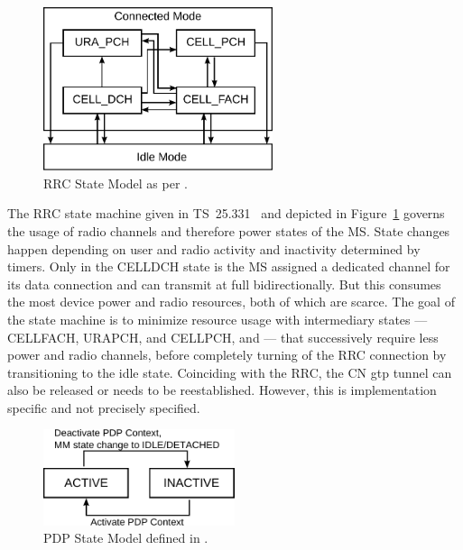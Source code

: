 \begin{figure}[htb] 
	\centering
	\includegraphics[width=0.6\textwidth]{images/rrc-state-model.pdf}
	\caption{\acrshort{RRC} State Model as per \cite[Section~7.1]{3gpp.25.331}.}
	\label{c4:fig:rrcstatemodel}
\end{figure}

 The \gls{RRC} state machine given in \gls{TS}~25.331~\cite[Section~7.1]{3gpp.25.331} and depicted in Figure~\ref{c4:fig:rrcstatemodel} governs the usage of radio channels and therefore power states of the \gls{MS}. State changes happen depending on user and radio activity and inactivity determined by timers. Only in the \gls{CELLDCH} state is the \gls{MS} assigned a dedicated channel for its data connection and can transmit at full bidirectionally. But this consumes the most device power and radio resources, both of which are scarce. The goal of the state machine is to minimize resource usage with intermediary states --- \gls{CELLFACH}, \gls{URAPCH}, and \gls{CELLPCH}, and  --- that successively require less power and radio channels, before completely turning of the \gls{RRC} connection by transitioning to the idle state. Coinciding with the \gls{RRC}, the \gls{CN} \gls{gtp} tunnel can also be released or needs to be reestablished. However, this is implementation specific and not precisely specified.

\begin{figure}[htb]
	\centering
	\includegraphics[width=0.5\textwidth]{images/pdp-state-model.pdf}
	\caption{\acrshort{PDP} State Model defined in \cite[Section~9]{3gpp.23.060}.}
\label{c4:fig:pdpstatemodel}
\end{figure}

